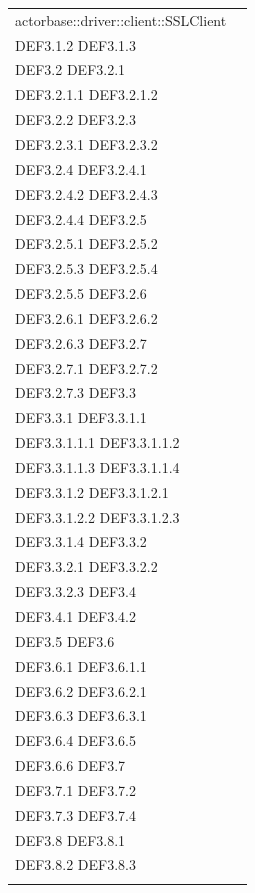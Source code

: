 \documentclass{scalatekids-article}
\begin{document}
\begin{longtable}[H]{|p{12cm}|p{5.5cm}|}
actorbase::driver::client::SSLClient & \multiLineCell[t]{DEF3.1 DEF3.1.1\\DEF3.1.2 DEF3.1.3\\DEF3.2 DEF3.2.1\\DEF3.2.1.1 DEF3.2.1.2\\DEF3.2.2 DEF3.2.3\\DEF3.2.3.1 DEF3.2.3.2\\DEF3.2.4 DEF3.2.4.1\\DEF3.2.4.2 DEF3.2.4.3\\DEF3.2.4.4 DEF3.2.5\\DEF3.2.5.1 DEF3.2.5.2\\DEF3.2.5.3 DEF3.2.5.4\\DEF3.2.5.5 DEF3.2.6\\DEF3.2.6.1 DEF3.2.6.2\\DEF3.2.6.3 DEF3.2.7\\DEF3.2.7.1 DEF3.2.7.2\\DEF3.2.7.3 DEF3.3\\DEF3.3.1 DEF3.3.1.1\\DEF3.3.1.1.1 DEF3.3.1.1.2\\DEF3.3.1.1.3 DEF3.3.1.1.4\\DEF3.3.1.2 DEF3.3.1.2.1\\DEF3.3.1.2.2 DEF3.3.1.2.3\\DEF3.3.1.4 DEF3.3.2\\DEF3.3.2.1 DEF3.3.2.2\\DEF3.3.2.3 DEF3.4\\DEF3.4.1 DEF3.4.2\\DEF3.5 DEF3.6\\DEF3.6.1 DEF3.6.1.1\\DEF3.6.2 DEF3.6.2.1\\DEF3.6.3 DEF3.6.3.1\\DEF3.6.4 DEF3.6.5\\DEF3.6.6 DEF3.7\\DEF3.7.1 DEF3.7.2\\DEF3.7.3 DEF3.7.4\\DEF3.8 DEF3.8.1\\DEF3.8.2 DEF3.8.3\\}\\
\hline

\end{longtable}
\end{document}

